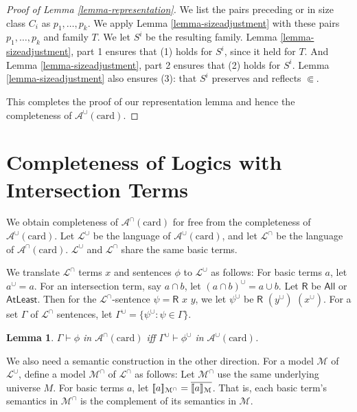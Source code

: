 \documentclass[letterpaper]{article} %
\newtheorem{lemma}[theorem]{Lemma}
\theoremstyle{definition}
\newcommand{\semantics}[1]{[\![\mbox{\em $ #1 $\/}]\!]}
\newcommand{\Model}{\mathcal{M}}
\newcommand{\set}[1]{\{ #1 \}}
\newcommand{\proves}{\vdash}
\newcommand{\lang}{\mathcal{L}}
\newcommand{\Aunion}{\mathscr{A}^{\cup}}
\newcommand{\Ainter}{\mathscr{A}^{\cap}}
\newcommand{\R}[2]{\mathsf{R}\,\,#1\,\,#2}
\newcommand{\AllNoArgs}{\mathsf{All}}
\newcommand{\AtleastNoArgs}{\mathsf{AtLeast}}
\newcommand{\card}{\mathrm{card}}
\newcommand{\precsubseteq}{\Subset}
\begin{document}
\begin{proof}[Proof of Lemma \ref{lemma-representation}]
We list the pairs preceding or in size class $C_i$ as $p_1, \ldots, p_k$.  We apply Lemma \ref{lemma-sizeadjustment} with these pairs $p_1, \ldots, p_k$ and family $T$.  We let $S^i$ be the resulting family.  Lemma \ref{lemma-sizeadjustment}, part 1 ensures that (1) holds for $S^i$, since it held for $T$.  And Lemma \ref{lemma-sizeadjustment}, part 2 ensures that (2) holds for $S^i$.  Lemma \ref{lemma-sizeadjustment} also ensures (3): that $S^i$ preserves and reflects $\precsubseteq$.

This completes the proof of our representation lemma and hence the completeness of $\Aunion(\card)$.
\end{proof}



\section{Completeness of Logics with \\Intersection Terms}\label{s:completenes_intersections}

We obtain completeness of $\Ainter(\card)$ for free from the completeness of  $\Aunion(\card)$.
Let $\lang^\cup$ be the language 
of $\Aunion(\card)$, and
let $\lang^\cap$ be the language of $\Ainter(\card)$. 
$\lang^\cup$ and $\lang^\cap$ share the same basic terms.


We  translate $\lang^\cap$ terms $x$ and sentences  $\phi$ to $\lang^\cup$ as follows:
 For basic terms $a$, let $a^\cup = a$. 
For an intersection term, say $a \cap b$, let $(a \cap b)^\cup = a \cup b$.  Let 
$\mathsf{R}$  be $\AllNoArgs$ or $\AtleastNoArgs$.
Then for the $\lang^\cap$-sentence
$\psi = \R{x}{y}$, we let     $\psi^\cup$ be  
 $\R{(y^\cup)}{(x^\cup)}$.  For a set $\Gamma$ of $\lang^\cap$ sentences,
 let $\Gamma^\cup = \set{\psi^\cup : \psi\in \Gamma}$.
 


\begin{lemma}
\label{lemma-proof-translation}
$\Gamma\proves\phi$ in $\Ainter(\card)$
iff $\Gamma^\cup\proves\phi^\cup$ in $\Aunion(\card)$.
\end{lemma}


We also need a semantic construction in the other direction.
For a model $\Model$ of $\lang^\cup$, define a model 
 $\Model^\cap$ of $\lang^\cap$ as follows:
Let $\Model^\cap$ use the same underlying universe $M$. 
For basic terms $a$, let $\semantics{a}_{\Model^\cap} = \overline{\semantics{a}_{\Model}}$.  That is, each
basic term's semantics 
in $\Model^\cap$
is the complement of its semantics in $\Model$.
\end{document}
